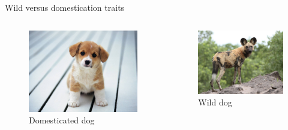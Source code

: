 \documentclass[
  ignorenonframetext,
  aspectratio=169]{beamer}
\begin{document}
\begin{frame}{Wild versus domestication traits}
\protect\hypertarget{wild-versus-domestication-traits}{}
\begin{columns}[T,onlytextwidth]
  
  
\begin{figure}
\includegraphics[width=0.8\linewidth]{./../images/domestic_dog_puppy} \caption{Domesticated dog}\label{fig:domesticated}
\end{figure}


\begin{figure}
\includegraphics[width=0.8\linewidth]{./../images/wild_dog_african} \caption{Wild dog}\label{fig:wild}
\end{figure}

\end{columns}
\end{frame}
\end{document}
